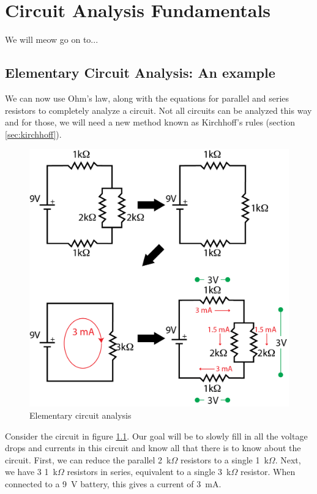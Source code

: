 \documentclass{tufte-book}
\begin{document}

\chapter{Circuit Analysis Fundamentals}
We will meow go on to...

\section{Elementary Circuit Analysis: An example}
\label{sec:circuitanalysis}
We can now use Ohm's law, along with the equations for parallel and series resistors to completely analyze a circuit. Not all circuits can be analyzed this way and for those, we will need a new method known as Kirchhoff's rules (section \ref{sec:kirchhoff}). 

\begin{figure}[h]
\caption{Elementary circuit analysis}
\label{fig:elemcirc}
\begin{center}
\includegraphics{elemcirc.png}
\end{center}
\end{figure}


Consider the circuit in figure \ref{fig:elemcirc}. Our goal will be to slowly fill in all the voltage drops and currents in this circuit and know all that there is to know about the circuit. First, we can reduce the parallel 2~k$\Omega$ resistors to a single 1~k$\Omega$. Next, we have 3 1~k$\Omega$ resistors in series, equivalent to a single 3~k$\Omega$ resistor. When connected to a 9~V battery, this gives a current of 3~mA. 
\end{document}
